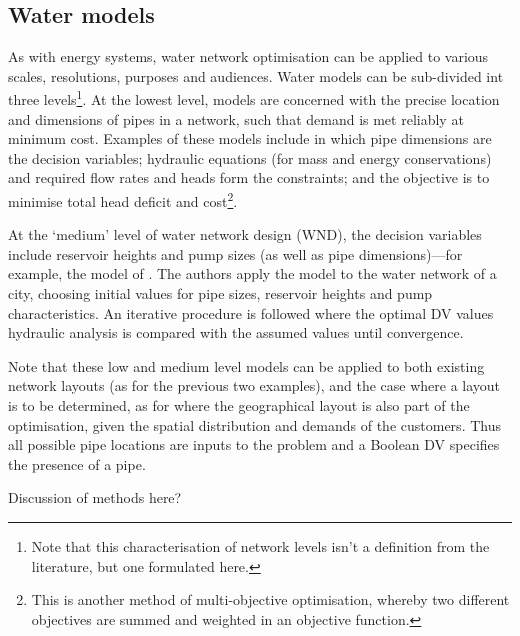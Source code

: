 \subsection{Water models}
As with energy systems, water network optimisation can be applied to various scales, resolutions, purposes and audiences. Water models can be sub-divided int three levels\footnote{Note that this characterisation of network levels isn't a definition from the literature, but one formulated here.}. At the lowest level, models are concerned with the precise location and dimensions of pipes in a network, such that demand is met reliably at minimum cost. Examples of these models include \citet{Keedwell2005} in which pipe dimensions are the decision variables; hydraulic equations (for mass and energy conservations) and required flow rates and heads form the constraints; and the objective is to minimise total head deficit and cost\footnote{This is another method of multi-objective optimisation, whereby two different objectives are summed and weighted in an objective function.}. 

At the `medium' level of water network design (WND), the decision variables include reservoir heights and pump sizes (as well as pipe dimensions)---for example, the model of \citet{Zangenah2010}. The authors apply the model to the water network of a city, choosing initial values for pipe sizes, reservoir heights and pump characteristics. An iterative procedure is followed where the optimal DV values hydraulic analysis is compared with the assumed values until convergence.

Note that these low and medium level models can be applied to both existing network layouts (as for the previous two examples), and the case where a layout is to be determined, as for \citet{Lejano2006} where the geographical layout is also part of the optimisation, given the spatial distribution and demands of the customers. Thus all possible pipe locations are inputs to the problem and a Boolean DV specifies the presence of a pipe. 

Discussion of methods here?

